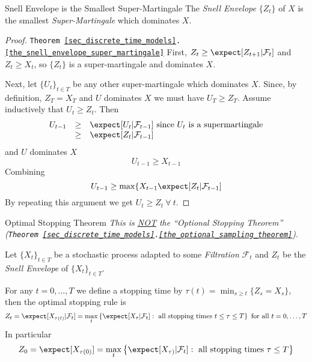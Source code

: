 \documentclass[11pt,a4paper]{article}
\begin{document}
  \begin{theorem}{Snell Envelope is the Smallest Super-Martingale}\label{the_snell_envelope_super_martingale}
    The \textit{Snell Envelope} $\{Z_t\}$ of $X$ is the smallest \textit{Super-Martingale} which dominates $X$.
  \end{theorem}

  \begin{proof}{\texttt{Theorem \ref{sec_discrete_time_models}.\ref{the_snell_envelope_super_martingale}}}
    First, $Z_t\geq\expect[Z_{t+1}|\mathcal{F}_t]$ and $Z_t\geq X_t$, so $\{Z_t\}$ is a super-martingale and dominates $X$.
    \par Next, let $\{U_t\}_{t\in T}$ be any other super-martingale which dominates $X$. Since, by definition, $Z_T=X_T$ and $U$ dominates $X$ we must have $U_T\geq Z_T$. Assume inductively that $U_t\geq Z_t$. Then
    \[\begin{array}{rcl}
      U_{t-1}&\geq&\expect[U_t|\mathcal{F}_{t-1}]\text{ since }U_t\text{ is a supermartingale}\\
      &\geq&\expect[Z_t|\mathcal{F}_{t-1}]
    \end{array}\]
    and $U$ dominates $X$
    \[ U_{t-1}\geq X_{t-1} \]
    Combining
    \[ U_{t-1}\geq\max\{X_{t-1}\expect[Z_t|\mathcal{F}_{t-1}] \]
    By repeating this argument we get $U_t\geq Z_t\ \forall\ t$.\proved
  \end{proof}

  \begin{theorem}{Optimal Stopping Theorem}\label{the_optimal_stopping_theorem}
    \textit{This is \underline{NOT} the ``Optional Stopping Theorem'' (\texttt{Theorem \ref{sec_discrete_time_models}.\ref{the_optional_sampling_theorem}})}.
    \par Let $\{X_t\}_{t\in T}$ be a stochastic process adapted to some \textit{Filtration} $\mathcal{F}_t$ and $Z_t$ be the \textit{Snell Envelope} of $\{X_t\}_{t\in T}$.
    \par For any $t=0,\dots,T$ we define a stopping time by $\tau(t)=\min_{s\geq t}\{Z_s=X_s\}$, then the optimal stopping rule is
    \begin{equation}\label{eq_optimal_stopping_rule}
      Z_t=\expect[X_{\tau(t)}|\mathcal{F}_t]=\max_t\left\{\expect[X_{\tau}|\mathcal{F}_t]:\text{ all stopping times }t\leq\tau\leq T\right\}\text{ for all }t=0,\dots,T
    \end{equation}
    In particular
    \[ Z_0=\expect[X_{\tau(0)}]=\max_t\left\{\expect[X_{\tau)}|\mathcal{F}_t]:\text{ all stopping times }\tau\leq T\right\} \]
  \end{theorem}
\end{document}
